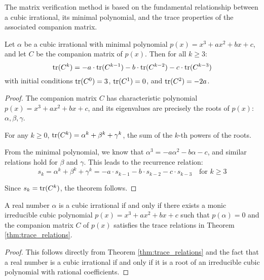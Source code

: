 The matrix verification method is based on the fundamental relationship between a cubic irrational, its minimal polynomial, and the trace properties of the associated companion matrix.

\begin{theorem}\label{thm:trace_relations}
Let $\alpha$ be a cubic irrational with minimal polynomial $p(x) = x^3 + ax^2 + bx + c$, and let $C$ be the companion matrix of $p(x)$. Then for all $k \geq 3$:
\begin{equation}
\operatorname{tr}(C^k) = -a \cdot \operatorname{tr}(C^{k-1}) - b \cdot \operatorname{tr}(C^{k-2}) - c \cdot \operatorname{tr}(C^{k-3})
\end{equation}
with initial conditions $\operatorname{tr}(C^0) = 3$, $\operatorname{tr}(C^1) = 0$, and $\operatorname{tr}(C^2) = -2a$.
\end{theorem}

\begin{proof}
The companion matrix $C$ has characteristic polynomial $p(x) = x^3 + ax^2 + bx + c$, and its eigenvalues are precisely the roots of $p(x)$: $\alpha, \beta, \gamma$.

For any $k \geq 0$, $\operatorname{tr}(C^k) = \alpha^k + \beta^k + \gamma^k$, the sum of the $k$-th powers of the roots.

From the minimal polynomial, we know that $\alpha^3 = -a\alpha^2 - b\alpha - c$, and similar relations hold for $\beta$ and $\gamma$. This leads to the recurrence relation:
\begin{equation}
s_k = \alpha^k + \beta^k + \gamma^k = -a \cdot s_{k-1} - b \cdot s_{k-2} - c \cdot s_{k-3} \quad \text{for } k \geq 3
\end{equation}

Since $s_k = \operatorname{tr}(C^k)$, the theorem follows.
\end{proof}

\begin{corollary}\label{cor:matrix_characterization}
A real number $\alpha$ is a cubic irrational if and only if there exists a monic irreducible cubic polynomial $p(x) = x^3 + ax^2 + bx + c$ such that $p(\alpha) = 0$ and the companion matrix $C$ of $p(x)$ satisfies the trace relations in Theorem \ref{thm:trace_relations}.
\end{corollary}

\begin{proof}
This follows directly from Theorem \ref{thm:trace_relations} and the fact that a real number is a cubic irrational if and only if it is a root of an irreducible cubic polynomial with rational coefficients.
\end{proof}


